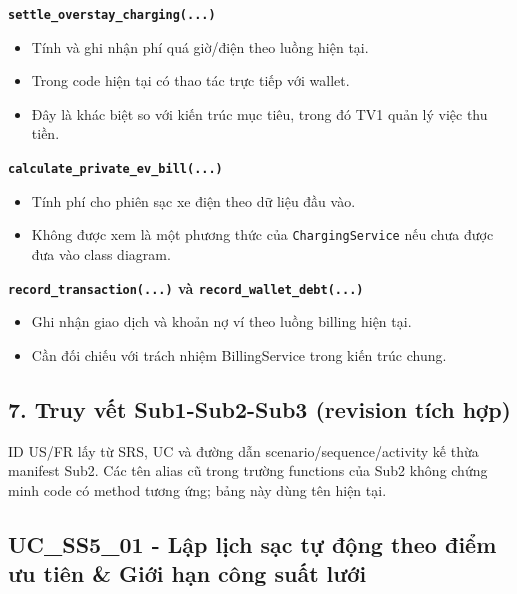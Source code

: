 \documentclass[11pt,a4paper]{article}
\providecommand{\tightlist}{%
  \setlength{\itemsep}{0pt}\setlength{\parskip}{0pt}}
\begin{document}
\textbf{\texttt{settle\_overstay\_charging(...)}}

\begin{itemize}
\tightlist
\item
  Tính và ghi nhận phí quá giờ/điện theo luồng hiện tại.
\item
  Trong code hiện tại có thao tác trực tiếp với wallet.
\item
  Đây là khác biệt so với kiến trúc mục tiêu, trong đó TV1 quản lý việc
  thu tiền.
\end{itemize}

\textbf{\texttt{calculate\_private\_ev\_bill(...)}}

\begin{itemize}
\tightlist
\item
  Tính phí cho phiên sạc xe điện theo dữ liệu đầu vào.
\item
  Không được xem là một phương thức của \texttt{ChargingService} nếu
  chưa được đưa vào class diagram.
\end{itemize}

\textbf{\texttt{record\_transaction(...)} và
\texttt{record\_wallet\_debt(...)}}

\begin{itemize}
\tightlist
\item
  Ghi nhận giao dịch và khoản nợ ví theo luồng billing hiện tại.
\item
  Cần đối chiếu với trách nhiệm BillingService trong kiến trúc chung.
\end{itemize}

\hypertarget{truy-vux1ebft-sub1-sub2-sub3-revision-tuxedch-hux1ee3p}{%
\subsection{7. Truy vết Sub1-Sub2-Sub3 (revision tích
hợp)}\label{truy-vux1ebft-sub1-sub2-sub3-revision-tuxedch-hux1ee3p}}

ID US/FR lấy từ SRS, UC và đường dẫn scenario/sequence/activity kế thừa
manifest Sub2. Các tên alias cũ trong trường functions của Sub2 không
chứng minh code có method tương ứng; bảng này dùng tên hiện tại.

\hypertarget{uc_ss5_01---lux1eadp-lux1ecbch-sux1ea1c-tux1ef1-ux111ux1ed9ng-theo-ux111iux1ec3m-ux1b0u-tiuxean-giux1edbi-hux1ea1n-cuxf4ng-suux1ea5t-lux1b0ux1edbi}{%
\subsection{UC\_SS5\_01 - Lập lịch sạc tự động theo điểm ưu tiên \& Giới
hạn công suất
lưới}\label{uc_ss5_01---lux1eadp-lux1ecbch-sux1ea1c-tux1ef1-ux111ux1ed9ng-theo-ux111iux1ec3m-ux1b0u-tiuxean-giux1edbi-hux1ea1n-cuxf4ng-suux1ea5t-lux1b0ux1edbi}}
\end{document}
